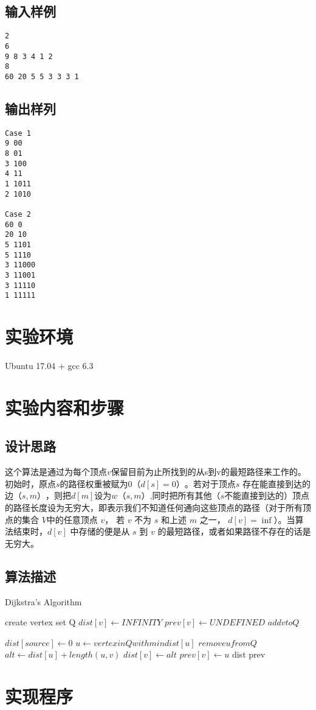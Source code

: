\documentclass{zjureport}
\begin{document}
\subsection{输入样例}
\begin{lstlisting}
2
6
9 8 3 4 1 2
8
60 20 5 5 3 3 3 1
\end{lstlisting}

\subsection{输出样列}
\begin{lstlisting}
Case 1
9 00
8 01
3 100
4 11
1 1011
2 1010

Case 2
60 0
20 10
5 1101
5 1110
3 11000
3 11001
3 11110
1 11111
\end{lstlisting}

\section{实验环境}
Ubuntu 17.04 + gcc 6.3

\section{实验内容和步骤}
	\subsection{设计思路}
	这个算法是通过为每个顶点$v$保留目前为止所找到的从s到v的最短路径来工作的。初始时，原点$s$的路径权重被赋为$0 （d[s] = 0）$。若对于顶点$s$ 存在能直接到达的边$（s,m）$，则把$d[m]$设为$w（s, m）$,同时把所有其他（$s$不能直接到达的）顶点的路径长度设为无穷大，即表示我们不知道任何通向这些顶点的路径（对于所有顶点的集合 $V $中的任意顶点 $v$， 若 $v$ 不为 $s$ 和上述 $m$ 之一， $d[v] = \inf$）。当算法结束时，$d[v]$ 中存储的便是从 $s$ 到 $v$ 的最短路径，或者如果路径不存在的话是无穷大。
	\newpage
	\subsection{算法描述}
		\begin{algorithm}[h!]
		\caption{Dijkstra's Algorithm} 
		\begin{algorithmic}[1]
				\State create vertex set Q
					\State $dist[v] \gets INFINITY$
					\State $prev[v] \gets UNDEFINED$
					\State $add v to Q$
				\EndFor

				$dist[source] \gets 0$
					\State $u \gets vertex in Q with min dist[u]$
					\State $remove u from Q$
						$alt \gets dist[u] + length(u,v)$
							$dist[v] \gets alt$
							$prev[v] \gets u$
						\EndIf
					\EndFor
				\EndWhile
				\Return dist prev
			\EndFunction
		\end{algorithmic}
		\end{algorithm}
\section{实现程序}
	\begin{clause}
		
	\end{clause}
\end{document}
